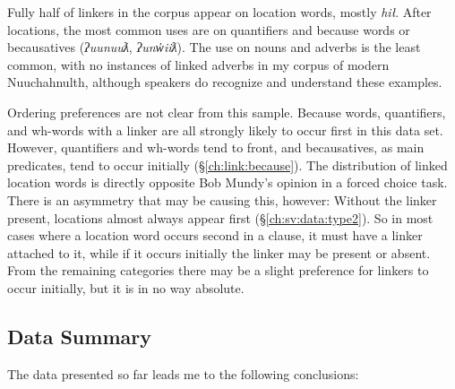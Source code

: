 Fully half of linkers in the corpus appear on location words, mostly \textit{hił}. After locations, the most common uses are on quantifiers and because words or becausatives (\textit{ʔuunuuƛ}, \textit{ʔunw̓iiƛ}). The use on nouns and adverbs is the least common, with no instances of linked adverbs in my corpus of modern Nuuchahnulth, although speakers do recognize and understand these examples.

Ordering preferences are not clear from this sample. Because words, quantifiers, and wh-words with a linker are all strongly likely to occur first in this data set. However, quantifiers and wh-words tend to front, and becausatives, as main predicates, tend to occur initially (\S\ref{ch:link:because}). The distribution of linked location words is directly opposite Bob Mundy's opinion in a forced choice task. There is an asymmetry that may be causing this, however: Without the linker present, locations almost always appear first (\S\ref{ch:sv:data:type2}). So in most cases where a location word occurs second in a clause, it must have a linker attached to it, while if it occurs initially the linker may be present or absent. From the remaining categories there may be a slight preference for linkers to occur initially, but it is in no way absolute.

\subsection{Data Summary}

The data presented so far leads me to the following conclusions:

